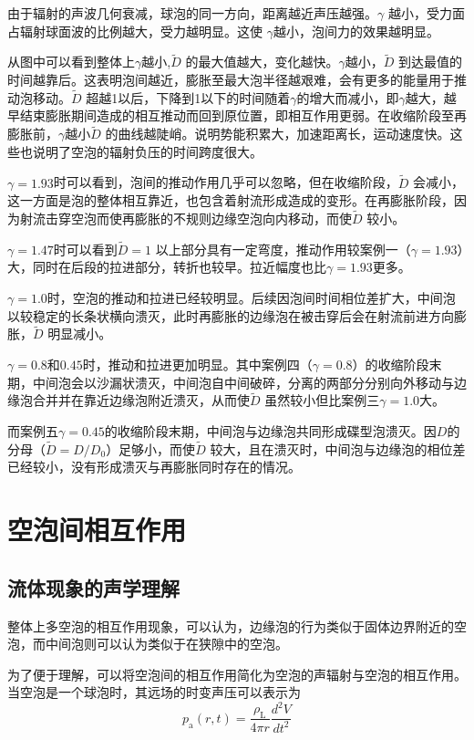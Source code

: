 由于辐射的声波几何衰减，球泡的同一方向，距离越近声压越强。$\gamma$
越小，受力面占辐射球面波的比例越大，受力越明显。这使
$\gamma$越小，泡间力的效果越明显。

从图中可以看到整体上$\gamma$越小,$\tilde{D}$
的最大值越大，变化越快。$\gamma$越小，$\tilde{D}$
到达最值的时间越靠后。这表明泡间越近，膨胀至最大泡半径越艰难，会有更多的能量用于推动泡移动。$\tilde{D}$
超越1以后，下降到1以下的时间随着$\gamma$的增大而减小，即$\gamma$越大，越早结束膨胀期间造成的相互推动而回到原位置，即相互作用更弱。在收缩阶段至再膨胀前，$\gamma$越小$\tilde{D}$
的曲线越陡峭。说明势能积累大，加速距离长，运动速度快。这些也说明了空泡的辐射负压的时间跨度很大。

$\gamma=1.93$时可以看到，泡间的推动作用几乎可以忽略，但在收缩阶段，$\tilde{D}$
会减小，这一方面是泡的整体相互靠近，也包含着射流形成造成的变形。在再膨胀阶段，因为射流击穿空泡而使再膨胀的不规则边缘空泡向内移动，而使$\tilde{D}$
较小。

$\gamma=1.47$时可以看到$\tilde{D}=1$
以上部分具有一定弯度，推动作用较案例一（$\gamma=1.93$）大，同时在后段的拉进部分，转折也较早。拉近幅度也比$\gamma=1.93$更多。

$\gamma=1.0$时，空泡的推动和拉进已经较明显。后续因泡间时间相位差扩大，中间泡以较稳定的长条状横向溃灭，此时再膨胀的边缘泡在被击穿后会在射流前进方向膨胀，$\tilde{D}$
明显减小。

$\gamma=0.8$和$0.45$时，推动和拉进更加明显。其中案例四（$\gamma=0.8$）的收缩阶段末期，中间泡会以沙漏状溃灭，中间泡自中间破碎，分离的两部分分别向外移动与边缘泡合并并在靠近边缘泡附近溃灭，从而使$\tilde{D}$
虽然较小但比案例三$\gamma=1.0$大。

而案例五$\gamma=0.45$的收缩阶段末期，中间泡与边缘泡共同形成碟型泡溃灭。因$D$的分母（$\tilde{D}={D}/{D_{\text{0}}}$）足够小，而使$\tilde{D}$
较大，且在溃灭时，中间泡与边缘泡的相位差已经较小，没有形成溃灭与再膨胀同时存在的情况。


\section{空泡间相互作用}

\subsection{流体现象的声学理解}

整体上多空泡的相互作用现象，可以认为，边缘泡的行为类似于固体边界附近的空泡，而中间泡则可以认为类似于在狭隙中的空泡。

为了便于理解，可以将空泡间的相互作用简化为空泡的声辐射与空泡的相互作用。
当空泡是一个球泡时，其远场的时变声压可以表示为
\[p_{\text{a}}(r,t)=\frac{\rho_{\text{L}}}{4\pi r}\frac{d^{2}V}{dt^{2}}\]

